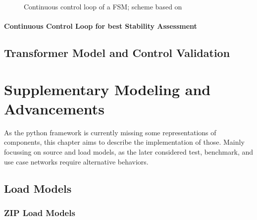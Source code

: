 \begin{figure}[htb!]
        \centering
        \caption{Continuous control loop of a \acs{FSM}; scheme based on \textcite{burlakinEnhancedVoltageControl2024}}
        \label{fig:fsm-continuous-control-loop}
\end{figure}

\subsubsection{Continuous Control Loop for best Stability Assessment}

\section{Transformer Model and Control Validation}


\chapter{Supplementary Modeling and Advancements}

As the python framework is currently missing some representations of components, this chapter aims to describe the implementation of those. Mainly focussing on source and load models, as the later considered test, benchmark, and use case networks require alternative behaviors. 

\section{Load Models}

\subsection{ZIP Load Models}


